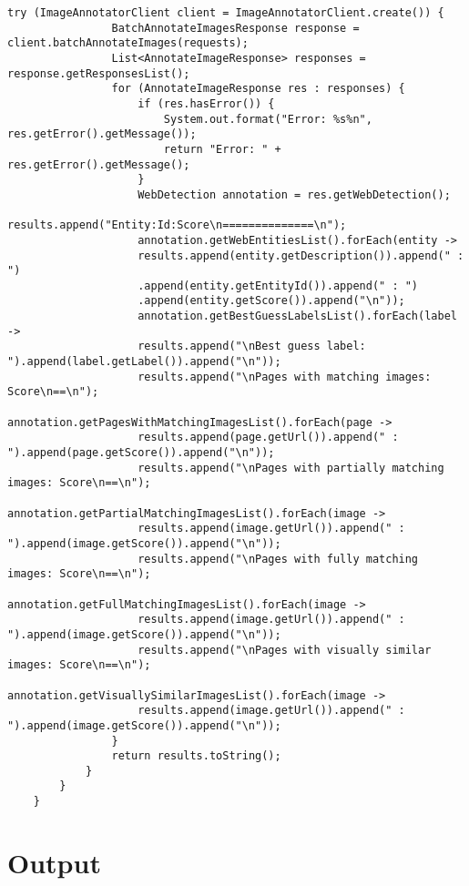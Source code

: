 \begin{lstlisting}[caption={Voorbeeld van een Java-klasse die de Google Vision API gebruikt om webdetecties te vinden. Gebaseerd op de documentatie van \autocite{googleVisionAPI}},label={lst:googlevisioncode}]
            try (ImageAnnotatorClient client = ImageAnnotatorClient.create()) {
                BatchAnnotateImagesResponse response = client.batchAnnotateImages(requests);
                List<AnnotateImageResponse> responses = response.getResponsesList();
                for (AnnotateImageResponse res : responses) {
                    if (res.hasError()) {
                        System.out.format("Error: %s%n", res.getError().getMessage());
                        return "Error: " + res.getError().getMessage();
                    }
                    WebDetection annotation = res.getWebDetection();
                    results.append("Entity:Id:Score\n==============\n");
                    annotation.getWebEntitiesList().forEach(entity ->
                    results.append(entity.getDescription()).append(" : ")
                    .append(entity.getEntityId()).append(" : ")
                    .append(entity.getScore()).append("\n"));
                    annotation.getBestGuessLabelsList().forEach(label ->
                    results.append("\nBest guess label: ").append(label.getLabel()).append("\n"));
                    results.append("\nPages with matching images: Score\n==\n");
                    annotation.getPagesWithMatchingImagesList().forEach(page ->
                    results.append(page.getUrl()).append(" : ").append(page.getScore()).append("\n"));
                    results.append("\nPages with partially matching images: Score\n==\n");
                    annotation.getPartialMatchingImagesList().forEach(image ->
                    results.append(image.getUrl()).append(" : ").append(image.getScore()).append("\n"));
                    results.append("\nPages with fully matching images: Score\n==\n");
                    annotation.getFullMatchingImagesList().forEach(image ->
                    results.append(image.getUrl()).append(" : ").append(image.getScore()).append("\n"));
                    results.append("\nPages with visually similar images: Score\n==\n");
                    annotation.getVisuallySimilarImagesList().forEach(image ->
                    results.append(image.getUrl()).append(" : ").append(image.getScore()).append("\n"));
                }
                return results.toString();
            }
        }
    }    
\end{lstlisting}

\section{Output}

